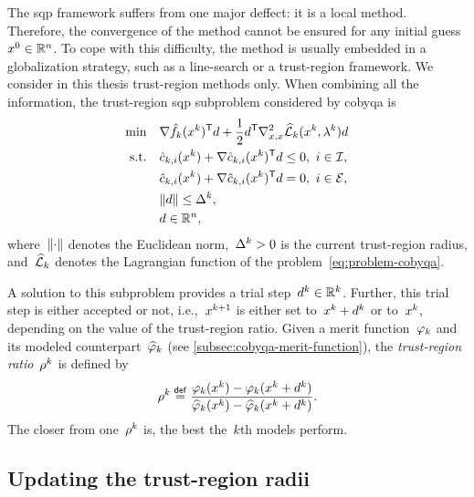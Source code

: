 The \gls{sqp} framework suffers from one major deffect: it is a local method.
Therefore, the convergence of the method cannot be ensured for any initial guess~$\iter[0] \in \R^n$.
To cope with this difficulty, the method is usually embedded in a globalization strategy, such as a line-search or a trust-region framework.
We consider in this thesis trust-region methods only.
When combining all the information, the trust-region \gls{sqp} subproblem considered by \gls{cobyqa} is
\begin{subequations}
    \begin{align}
        \min        & \quad \nabla \objm[k](\iter[k])^{\T} \step + \frac{1}{2} \step^{\T} \nabla_{x, x}^2 \lagm[k](\iter[k], \lambda^k) \step \label{derivative-free-trust-region-sqp-subproblem-obj}\\
        \text{s.t.} & \quad \conm[k]{i}(\iter[k]) + \nabla \conm[k]{i}(\iter[k])^{\T} \step \le 0, ~ i \in \iub,\\
                    & \quad \conm[k]{i}(\iter[k]) + \nabla \conm[k]{i}(\iter[k])^{\T} \step = 0, ~ i \in \ieq,\\
                    & \quad \norm{\step} \le \rad[k],\\
                    & \quad \step \in \R^n,
    \end{align}
\end{subequations}
where~$\lVert\cdot\rVert$ denotes the Euclidean norm,~$\rad[k] > 0$ is the current trust-region radius, and~$\lagm[k]$ denotes the Lagrangian function of the problem~\cref{eq:problem-cobyqa}.

A solution to this subproblem provides a trial step~$d^k \in \mathbb{R}^k$.
Further, this trial step is either accepted or not, i.e.,~$\iter[k + 1]$ is either set to~$\iter[k] + d^k$ or to~$\iter[k]$, depending on the value of the trust-region ratio.
Given a merit function~$\merit[k]$ and its modeled counterpart~$\meritm[k]$ (see \cref{subsec:cobyqa-merit-function}), the \emph{trust-region ratio}~$\ratio[k]$ is defined by
\begin{equation*}
    \ratio[k] \eqdef \frac{\merit[k](\iter[k]) - \merit[k](\iter[k] + d^k)}{\meritm[k](\iter[k]) - \meritm[k](\iter[k] + d^k)}.
\end{equation*}
The closer from one~$\ratio[k]$ is, the best the~$k$th models perform.

\subsection{Updating the trust-region radii}

